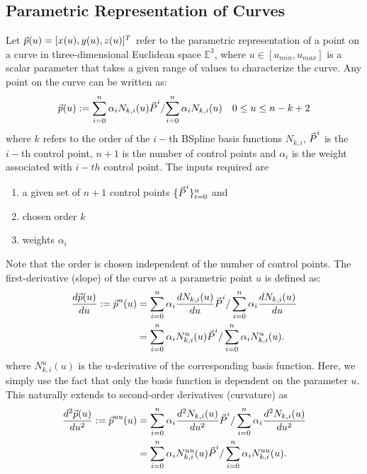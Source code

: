 \documentclass[submit,12pt]{aiaa-pretty} %
\begin{document}
\subsection{Parametric Representation of Curves}
Let $\vec{\mkern0mup}(u) = [x(u), y(u), z(u)]^T$ refer to the parametric
representation of a point on a curve in three-dimensional Euclidean
space $\mathbb{E}^3$, where $u \in [u_{min}, u_{max}]$ is a scalar
parameter that takes a given range of values to characterize the curve. 
Any point on the curve can be written as:
\begin{equation}
  \vec{\mkern0mup}(u) := {\sum_{i=0}^n \alpha_i N_{k,i}(u) \vec{\mkern0muP}^{i}}/{\sum_{i=0}^n \alpha_i N_{k,i}(u)} \quad 0 \le u \le n-k+2
\end{equation}
where $k$ refers to the order of the $i-$th BSpline basis functions $N_{k,i}$, 
$\vec{\mkern0muP}^i$ is the $i-$th control point,  $n+1$ is the number of control points
and $\alpha_i$ is the weight associated with $i-th$ control point. 
The inputs required  are 
\begin{enumerate}
\item a given set of $n+1$ control points $\{\vec{\mkern0muP}^i\}_{i=0}^n$ and 
\item chosen order $k$
\item weights $\alpha_i$
\end{enumerate}
Note that the order is chosen independent of the number of control
points. The first-derivative (slope) of the curve at a parametric point $u$ is defined as:
\begin{equation}
  \begin{aligned}
    \dfrac{d \vec{\mkern0mup}(u)}{d u} := \vec{\mkern0mup}^u(u) & = \sum_{i=0}^n  \alpha_i \dfrac{d N_{k,i}(u)}{d u} \vec{\mkern0muP}^{i} / \sum_{i=0}^n \alpha_i \dfrac{d N_{k,i}(u)}{d u}  \\ &= \sum_{i=0}^n \alpha_i N_{k,i}^{u}(u) \vec{\mkern0muP}^{i} /\sum_{i=0}^n \alpha_i N_{k,i}^{u}(u).
  \end{aligned}
\end{equation}
where $N_{k,i}^u(u)$ is the u-derivative of the corresponding basis
function. Here, we simply use the fact that only the basis function is
dependent on the parameter $u$. This naturally extends to second-order
derivatives (curvature) as
\begin{equation}
  \begin{aligned}
    \dfrac{d^2 \vec{\mkern0mup}(u)}{d u^2} := \vec{\mkern0mup}^{uu}(u) & = \sum_{i=0}^n \alpha_i \dfrac{d^2 N_{k,i}(u)}{d u^2} \vec{\mkern0muP}^{i}/\sum_{i=0}^n \alpha_i \dfrac{d^2 N_{k,i}(u)}{d u^2} \\ & = \sum_{i=0}^n \alpha_i N_{k,i}^{uu}(u) \vec{\mkern0muP}^{i}/\sum_{i=0}^n \alpha_i N_{k,i}^{uu}(u).
  \end{aligned}
\end{equation}
\end{document}
